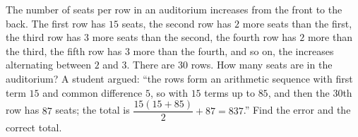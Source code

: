 The number of seats per row in an auditorium increases from the front to the back. The first row has $15$ seats, the second row has $2$ more seats than the first, the third row has $3$ more seats than the second, the fourth row has $2$ more than the third, the fifth row has $3$ more than the fourth, and so on, the increases alternating between $2$ and $3$. There are $30$ rows. How many seats are in the auditorium? A student argued: ``the rows form an arithmetic sequence with first term $15$ and common difference $5$, so with $15$ terms up to $85$, and then the $30$th row has $87$ seats; the total is $\dfrac{15(15+85)}{2}+87=837$.'' Find the error and the correct total.
